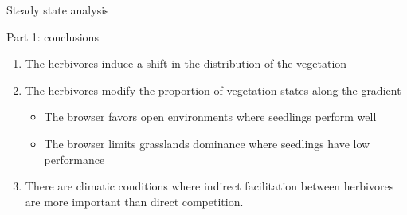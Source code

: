\documentclass[10pt,aspectratio=149]{beamer}
\begin{document}

\begin{frame}{Steady state analysis}







\end{frame}

\begin{frame}{Part 1: conclusions}
\begin{enumerate}

\item The herbivores induce a \alert{shift} in the distribution of the vegetation 

\item The herbivores \alert{modify the proportion} of vegetation states along the gradient
\begin{itemize}
\item The browser \alert{favors open environments where seedlings perform well}
\item The browser \alert{limits grasslands dominance where seedlings have low performance} 
\end{itemize}


\item There are climatic conditions where \alert{indirect facilitation} between herbivores are more important than direct competition.

\end{enumerate}


\end{frame}
\end{document}
